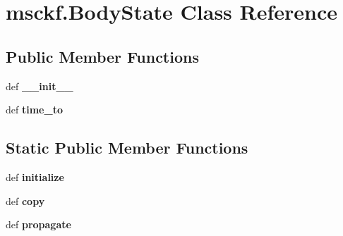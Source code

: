 \hypertarget{classmsckf_1_1_body_state}{\section{msckf.\-Body\-State Class Reference}
\label{classmsckf_1_1_body_state}
}
\subsection*{Public Member Functions}
\begin{DoxyCompactItemize}
\item 
\hypertarget{classmsckf_1_1_body_state_a869468e1c496f460ccef10fe473af84c}{def {\bfseries \-\_\-\-\_\-init\-\_\-\-\_\-}}\label{classmsckf_1_1_body_state_a869468e1c496f460ccef10fe473af84c}

\item 
\hypertarget{classmsckf_1_1_body_state_a7e6fbd3db5a74297588a40ebb9c70fa0}{def {\bfseries time\-\_\-to}}\label{classmsckf_1_1_body_state_a7e6fbd3db5a74297588a40ebb9c70fa0}

\end{DoxyCompactItemize}
\subsection*{Static Public Member Functions}
\begin{DoxyCompactItemize}
\item 
\hypertarget{classmsckf_1_1_body_state_a7b9cebebc5b911a398fe008a17f3f457}{def {\bfseries initialize}}\label{classmsckf_1_1_body_state_a7b9cebebc5b911a398fe008a17f3f457}

\item 
\hypertarget{classmsckf_1_1_body_state_ae376c49e3f60498704092e5295a4355f}{def {\bfseries copy}}\label{classmsckf_1_1_body_state_ae376c49e3f60498704092e5295a4355f}

\item 
\hypertarget{classmsckf_1_1_body_state_a6edd2c5e28633b9ebf2656a2cd9059d2}{def {\bfseries propagate}}\label{classmsckf_1_1_body_state_a6edd2c5e28633b9ebf2656a2cd9059d2}

\end{DoxyCompactItemize}
